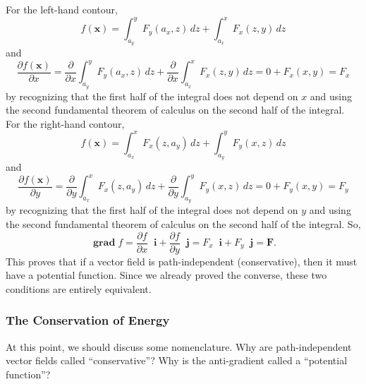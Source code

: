 \documentclass{myarticle}
\DeclareMathOperator{\grad}{\mathbf{grad}}
\renewcommand{\vec}[1]{\mathbf{#1}}
\newcommand{\unitvector}[1]{
  \mathop{}\!\vec{#1}
}
\newcommand{\ih}{\unitvector{i}}
\newcommand{\jh}{\unitvector{j}}
\theoremstyle{nospace}
\newtheorem{old series theorem}{Theorem}
\newenvironment{series theorem}
{\begin{mdframed}\begin{old series theorem}}
    {\end{old series theorem}\end{mdframed}}
\begin{document}
For the left-hand contour,
\[
  f(\vec{x})
  = \int_{a_y}^y F_y(a_x, z) \,dz + \int_{a_x}^x F_x(z, y) \,dz
\]
and
\[
  \frac{\partial f(\vec{x})}{\partial x}
  = \frac{\partial}{\partial x} \int_{a_y}^y F_y(a_x, z) \,dz
  + \frac{\partial}{\partial x} \int_{a_x}^x F_x(z, y) \,dz
  = 0 + F_x(x, y)
  = F_x
\]
by recognizing that the first half of the integral does not depend on
$x$ and using the second fundamental theorem of calculus on the second
half of the integral. For the right-hand contour,
\[
  f(\vec{x})
  = \int_{a_x}^x F_x(z, a_y) \,dz + \int_{a_y}^y F_y(x, z) \,dz
\]
and
\[
  \frac{\partial f(\vec{x})}{\partial y}
  = \frac{\partial}{\partial y} \int_{a_x}^x F_x(z, a_y) \,dz
  + \frac{\partial}{\partial y} \int_{a_y}^y F_y(x, z) \,dz
  = 0 + F_y(x, y)
  = F_y
\]
by recognizing that the first half of the integral does not depend on
$y$ and using the second fundamental theorem of calculus on the second
half of the integral. So,
\[
  \grad f
  = \frac{\partial f}{\partial x} \ih
  + \frac{\partial f}{\partial y} \jh
  = F_x \ih + F_y \jh
  = \vec{F}.
\]
This proves that if a vector field is path-independent (conservative),
then it must have a potential function. Since we already proved the
converse, these two conditions are entirely equivalent.

\subsubsection{The Conservation of Energy}
\label{sec:conservation of energy}

At this point, we should discuss some nomenclature. Why are
path-independent vector fields called ``conservative''? Why is the
anti-gradient called a ``potential function''?
\end{document}
